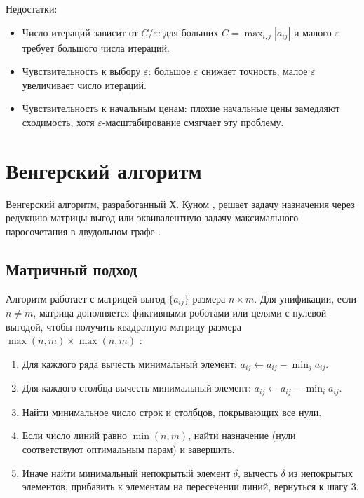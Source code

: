 Недостатки:
\begin{itemize}
    \item Число итераций зависит от \( C / \varepsilon \): для больших \( C = \max_{i,j} |a_{ij}| \) и малого \( \varepsilon \) требует большого числа итераций.
    \item Чувствительность к выбору \( \varepsilon \): большое \( \varepsilon \) снижает точность, малое \( \varepsilon \) увеличивает число итераций.
    \item Чувствительность к начальным ценам: плохие начальные цены замедляют сходимость, хотя \( \varepsilon \)-масштабирование смягчает эту проблему.
\end{itemize}

\section{Венгерский алгоритм}
Венгерский алгоритм, разработанный Х. Куном \cite{kuhn1955}, решает задачу назначения через редукцию матрицы выгод или эквивалентную задачу максимального паросочетания в двудольном графе \cite{emaxx2025}.

\subsection{Матричный подход}
Алгоритм работает с матрицей выгод \( \{a_{ij}\} \) размера \( n \times m \). Для унификации, если \( n \neq m \), матрица дополняется фиктивными роботами или целями с нулевой выгодой, чтобы получить квадратную матрицу размера \( \max(n, m) \times \max(n, m) \) \cite{kuhn1955}:

\begin{enumerate}
    \item Для каждого ряда вычесть минимальный элемент: \( a_{ij} \gets a_{ij} - \min_j a_{ij} \).
    \item Для каждого столбца вычесть минимальный элемент: \( a_{ij} \gets a_{ij} - \min_i a_{ij} \).
    \item Найти минимальное число строк и столбцов, покрывающих все нули.
    \item Если число линий равно \( \min(n, m) \), найти назначение (нули соответствуют оптимальным парам) и завершить.
    \item Иначе найти минимальный непокрытый элемент \( \delta \), вычесть \( \delta \) из непокрытых элементов, прибавить к элементам на пересечении линий, вернуться к шагу 3.
\end{enumerate}

